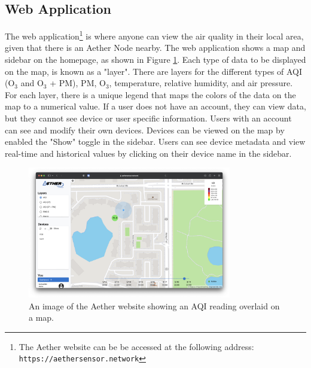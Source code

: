 \documentclass[conference]{IEEEtran}
\begin{document}
\subsection{Web Application}
The web application\footnote{The Aether website can be be accessed at the following address: \texttt{https://aethersensor.network}} is where anyone can view the air quality in their local area, given that there is an Aether Node nearby. The web application shows a map and sidebar on the homepage, as shown in Figure \ref{fig:website}. Each type of data to be displayed on the map, is known as a "layer". There are layers for the different types of AQI (O$_3$ and O$_3$ + PM), PM, O$_3$, temperature, relative humidity, and air pressure. For each layer, there is a unique legend that maps the colors of the data on the map to a numerical value. If a user does not have an account, they can view data, but they cannot see device or user specific information. Users with an account can see and modify their own devices. Devices can be viewed on the map by enabled the "Show" toggle in the sidebar. Users can see device metadata and view real-time and historical values by clicking on their device name in the sidebar.


\begin{figure}
    \centering
    \includegraphics[width=3.5in]{img/website.png}
    \caption{An image of the Aether website showing an AQI reading overlaid on a map.}
    \label{fig:website}
\end{figure}
\end{document}

